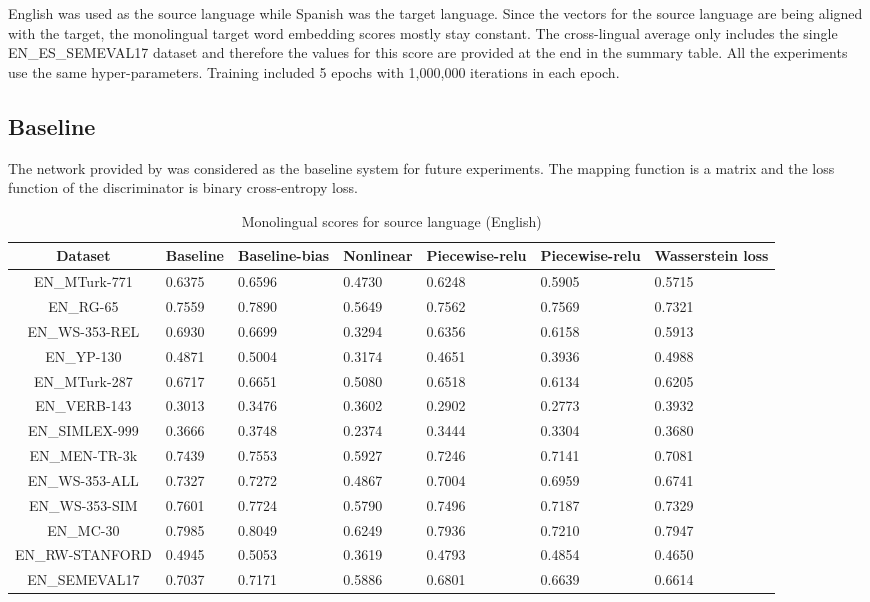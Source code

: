 \documentclass[11pt]{article}
\begin{document}
English was used as the source language while Spanish was the target language. Since the vectors for the source language are being aligned with the target, the monolingual target word embedding scores mostly stay constant. The cross-lingual average only includes the single EN\_ES\_SEMEVAL17 dataset and therefore the values for this score are provided at the end in the summary table. All the experiments use the same hyper-parameters. Training included 5 epochs with 1,000,000 iterations in each epoch.

\subsection{Baseline} \label{baseline}
The network provided by \cite{muserepo} was considered as the baseline system for future experiments. The mapping function is a matrix and the loss function of the discriminator is binary cross-entropy loss.

\begin{table*}[ht]
  \begin{center}
  \begin{tabular}{|c|l|l|l|l|l|l|}
  \hline
  Dataset & Baseline & Baseline-bias & Nonlinear & Piecewise-relu & Piecewise-relu & Wasserstein loss\\
  \hline
  EN\_MTurk-771 & 0.6375 & 0.6596 & 0.4730 & 0.6248 & 0.5905 & 0.5715 \\
  \hline
  EN\_RG-65 & 0.7559 & 0.7890 & 0.5649 & 0.7562 & 0.7569 & 0.7321 \\
  \hline
  EN\_WS-353-REL & 0.6930 & 0.6699 & 0.3294 & 0.6356 & 0.6158 & 0.5913 \\
  \hline
  EN\_YP-130 & 0.4871 & 0.5004 & 0.3174 & 0.4651 & 0.3936 & 0.4988 \\
  \hline
  EN\_MTurk-287 & 0.6717 & 0.6651 & 0.5080 & 0.6518 & 0.6134 & 0.6205 \\
  \hline
  EN\_VERB-143 & 0.3013 & 0.3476 & 0.3602 & 0.2902 & 0.2773 & 0.3932 \\
  \hline
  EN\_SIMLEX-999 & 0.3666 & 0.3748 & 0.2374 & 0.3444 & 0.3304 & 0.3680 \\
  \hline
  EN\_MEN-TR-3k & 0.7439 & 0.7553 & 0.5927 & 0.7246 & 0.7141 & 0.7081 \\
  \hline
  EN\_WS-353-ALL & 0.7327 & 0.7272 & 0.4867 & 0.7004 & 0.6959 & 0.6741 \\
  \hline
  EN\_WS-353-SIM & 0.7601 & 0.7724 & 0.5790 & 0.7496 & 0.7187 & 0.7329 \\
  \hline
  EN\_MC-30 & 0.7985 & 0.8049 & 0.6249 & 0.7936 & 0.7210 & 0.7947 \\
  \hline
  EN\_RW-STANFORD & 0.4945 & 0.5053 & 0.3619 & 0.4793 & 0.4854 & 0.4650 \\
  \hline
  EN\_SEMEVAL17 & 0.7037 & 0.7171 & 0.5886 & 0.6801 & 0.6639 & 0.6614 \\
  \hline
  \end{tabular}
  \end{center}
  \caption{ Monolingual scores for source language (English)}
  \label{monolingual-source}
\end{table*}
\end{document}
